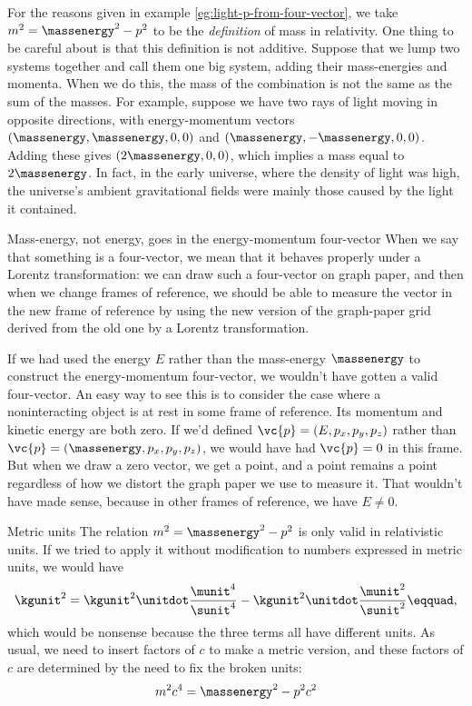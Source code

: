 For the reasons given in example \ref{eg:light-p-from-four-vector}, we take
$m^2 = \massenergy^2 - p^2$ to be the \emph{definition} of mass in relativity.
One thing to be careful about is that this definition is not additive. Suppose that we lump
two systems together and call them one big system, adding their mass-energies and momenta.
When we do this, the mass of the combination is not the same as  the sum of the masses.
For example, suppose we have two rays of light moving in opposite directions, with
energy-momentum vectors $(\massenergy,\massenergy,0,0)$ and $(\massenergy,-\massenergy,0,0)$.
Adding these gives $(2\massenergy,0,0)$, which implies a mass equal to $2\massenergy$. In
fact, in the early universe, where the density of light was high, the universe's ambient
gravitational fields were mainly those caused by the light it contained.

\begin{eg}{Mass-energy, not energy, goes in the energy-momentum four-vector}
When we say that something is a four-vector, we mean that it behaves properly under a Lorentz transformation:
we can draw such a four-vector on graph paper, and then when we change frames of reference, we should be able
to measure the vector in the new frame of reference by using the new version of the graph-paper grid derived
from the old one by a Lorentz transformation.

If we had used the energy $E$ rather than the mass-energy $\massenergy$ to
construct the energy-momentum four-vector, we wouldn't have gotten a valid four-vector.
An easy way to see this is to consider the case where a noninteracting object is at rest in some frame of reference.
Its momentum and kinetic energy are both zero.
If we'd defined $\vc{p}=(E,p_x,p_y,p_z)$ rather than $\vc{p}=(\massenergy,p_x,p_y,p_z)$, we would have had $\vc{p}=0$ in this
frame. But when we draw a zero vector, we get a point, and a point remains a point regardless of how
we distort the graph paper we use to measure it. That wouldn't have made sense, because in other frames
of reference, we  have $E\ne 0$.
\end{eg}

\begin{eg}{Metric units}
The relation $  m^2 = \massenergy^2 - p^2 $ is only valid in relativistic units. If we tried to apply it without
modification to numbers expressed in metric units, we would have
\begin{equation*}
  \kgunit^2 = \kgunit^2\unitdot\frac{\munit^4}{\sunit^4} - \kgunit^2\unitdot\frac{\munit^2}{\sunit^2}\eqquad,
\end{equation*}
which would be nonsense because the three terms all have different units. As usual, we need to insert factors
of $c$ to make a metric version, and these factors of $c$ are determined by the need to fix the broken units:
\begin{equation*}
  m^2c^4 = \massenergy^2 - p^2c^2
\end{equation*}
\end{eg}

